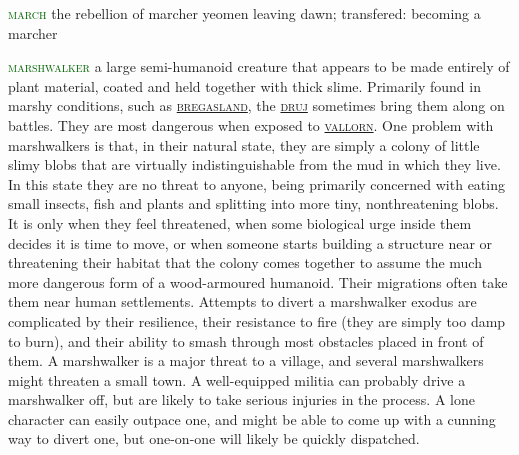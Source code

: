 \documentclass[twoside,11pt,b5paper,twocolumn]{scrbook}
\newcommand{\estcab}[1]{\textsc{\textcolor{marron}{#1}}}
\renewcommand{\paragraph}[1]{\par\noindent\markboth{#1}{#1}\estcab{\textcolor{darkgreen}{#1}}\label{#1} }
\newcommand{\see}[1]{{\estcab{\hyperref[#1]{#1}}}}
\begin{document}
\paragraph{march} the rebellion of marcher yeomen leaving dawn; transfered: becoming a marcher
\paragraph{marshwalker} a large semi-humanoid creature that appears to be made entirely of plant material, coated and held together with thick slime. Primarily found in marshy conditions, such as \see{bregasland}, the \see{druj} sometimes bring them along on battles. They are most dangerous when exposed to \see{vallorn}. One problem with marshwalkers is that, in their natural state, they are simply a colony of little slimy blobs that are virtually indistinguishable from the mud in which they live. In this state they are no threat to anyone, being primarily concerned with eating small insects, fish and plants and splitting into more tiny, nonthreatening blobs. It is only when they feel threatened, when some biological urge inside them decides it is time to move, or when someone starts building a structure near or threatening their habitat that the colony comes together to assume the much more dangerous form of a wood-armoured humanoid. Their migrations often take them near human settlements. Attempts to divert a marshwalker exodus are complicated by their resilience, their resistance to fire (they are simply too damp to burn), and their ability to smash through most obstacles placed in front of them. A marshwalker is a major threat to a village, and several marshwalkers might threaten a small town. A well-equipped militia can probably drive a marshwalker off, but are likely to take serious injuries in the process. A lone character can easily outpace one, and might be able to come up with a cunning way to divert one, but one-on-one will likely be quickly dispatched. 
\end{document}
